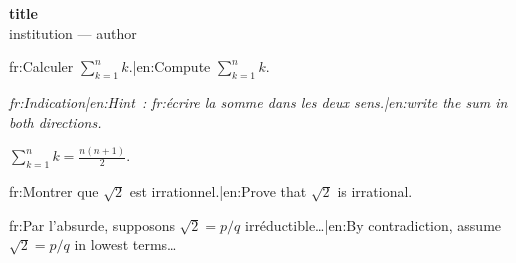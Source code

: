 \documentclass[11pt,a4paper]{article}
\newcounter{exo}
\newcommand{\indication}[1]{\par\noindent\textit{{{fr:Indication|en:Hint}}~: #1}}
\begin{document}
\begin{center}
  {\Large\bfseries {{title}}}\\[2pt]
  {{institution}} --- {{author}}
\end{center}

\begin{exo}[1]
  {{fr:Calculer $\displaystyle\sum_{k=1}^{n} k$.|en:Compute $\displaystyle\sum_{k=1}^{n} k$.}}
  \indication{{{fr:écrire la somme dans les deux sens.|en:write the sum in both directions.}}}
  \begin{correction}
    $\displaystyle\sum_{k=1}^{n} k = \frac{n(n+1)}{2}$.
  \end{correction}
\end{exo}

\begin{exo}[2]
  {{fr:Montrer que $\sqrt{2}$ est irrationnel.|en:Prove that $\sqrt{2}$ is irrational.}}
  \begin{correction}
    {{fr:Par l'absurde, supposons $\sqrt{2} = p/q$ irréductible…|en:By contradiction, assume $\sqrt{2} = p/q$ in lowest terms…}}
  \end{correction}
\end{exo}
\end{document}
